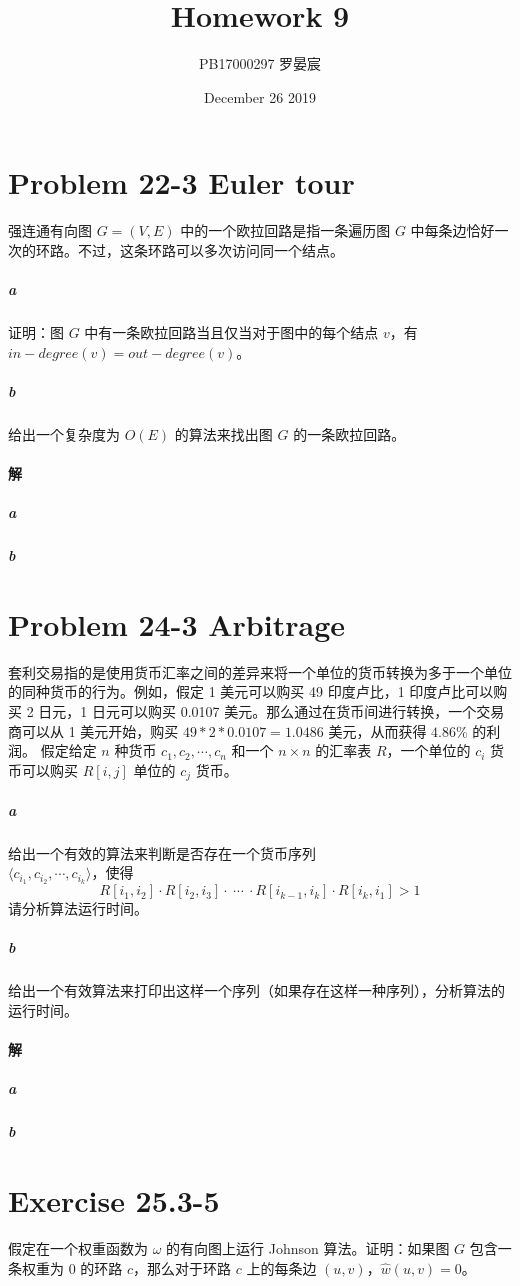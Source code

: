 \documentclass{article}
\title{Homework 9}
\author{PB17000297 罗晏宸}
\date{December 26 2019}
\begin{document}
\maketitle

\section{Problem 22-3 Euler tour}
强连通有向图 $G = (V,E)$ 中的一个欧拉回路是指一条遍历图 $G$ 中每条边恰好一次的环路。不过，这条环路可以多次访问同一个结点。
\subparagraph{a} 证明：图 $G$ 中有一条欧拉回路当且仅当对于图中的每个结点 $v$，有 $in−degree(v) = out−degree(v)$。
\subparagraph{b} 给出一个复杂度为 $O(E)$ 的算法来找出图 $G$ 的一条欧拉回路。

\paragraph{解}
\subparagraph{a}

\subparagraph{b}


\section{Problem 24-3 Arbitrage}
套利交易指的是使用货币汇率之间的差异来将一个单位的货币转换为多于一个单位的同种货币的行为。例如，假定 1 美元可以购买 49 印度卢比，1 印度卢比可以购买 2 日元，1 日元可以购买 0.0107 美元。那么通过在货币间进行转换，一个交易商可以从 1 美元开始，购买 $49*2*0.0107=1.0486$ 美元，从而获得 $4.86\%$ 的利润。
假定给定 $n$ 种货币 $c_1, c_2, \cdots, c_n$ 和一个 $n \times n$ 的汇率表 $R$，一个单位的 $c_i$ 货币可以购买 $R[i, j]$ 单位的 $c_j$ 货币。
\subparagraph{a} 给出一个有效的算法来判断是否存在一个货币序列 \\
$\langle c_{i_1}, c_{i_2}, \cdots, c_{i_k} \rangle$，使得
\begin{equation*}
	R[i_1, i_2] \cdot R[i_2, i_3] \cdot\ \cdots\ \cdot R[i_{k−1}, i_k] \cdot R[i_k, i_1] > 1
\end{equation*}
请分析算法运行时间。
\subparagraph{b} 给出一个有效算法来打印出这样一个序列（如果存在这样一种序列），分析算法的运行时间。

\paragraph{解}
\subparagraph{a}

\subparagraph{b}


\section{Exercise 25.3-5}
假定在一个权重函数为 $\omega$ 的有向图上运行 Johnson 算法。证明：如果图 $G$ 包含一条权重为 $0$ 的环路 $c$，那么对于环路 $c$ 上的每条边 $(u, v)$，$\hat{w}(u,v) = 0$。
\end{document}
